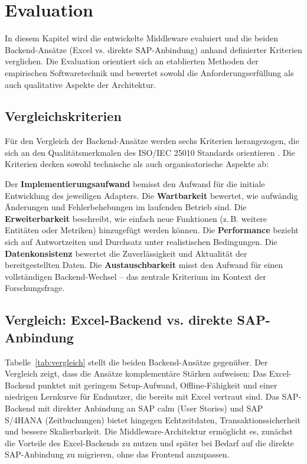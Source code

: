 \section{Evaluation}

In diesem Kapitel wird die entwickelte Middleware evaluiert und die beiden Backend-Ansätze (Excel vs. direkte SAP-Anbindung) anhand definierter Kriterien verglichen. Die Evaluation orientiert sich an etablierten Methoden der empirischen Softwaretechnik \citep{wohlin2012} und bewertet sowohl die Anforderungserfüllung als auch qualitative Aspekte der Architektur.

\subsection{Vergleichskriterien}

Für den Vergleich der Backend-Ansätze werden sechs Kriterien herangezogen, die sich an den Qualitätsmerkmalen des ISO/IEC 25010 Standards orientieren \citep{bass2021}. Die Kriterien decken sowohl technische als auch organisatorische Aspekte ab:

Der \textbf{Implementierungsaufwand} bemisst den Aufwand für die initiale Entwicklung des jeweiligen Adapters. Die \textbf{Wartbarkeit} bewertet, wie aufwändig Änderungen und Fehlerbehebungen im laufenden Betrieb sind. Die \textbf{Erweiterbarkeit} beschreibt, wie einfach neue Funktionen (z.\,B. weitere Entitäten oder Metriken) hinzugefügt werden können. Die \textbf{Performance} bezieht sich auf Antwortzeiten und Durchsatz unter realistischen Bedingungen. Die \textbf{Datenkonsistenz} bewertet die Zuverlässigkeit und Aktualität der bereitgestellten Daten. Die \textbf{Austauschbarkeit} misst den Aufwand für einen vollständigen Backend-Wechsel -- das zentrale Kriterium im Kontext der Forschungsfrage.

\subsection{Vergleich: Excel-Backend vs. direkte SAP-Anbindung}

Tabelle~\ref{tab:vergleich} stellt die beiden Backend-Ansätze gegenüber. Der Vergleich zeigt, dass die Ansätze komplementäre Stärken aufweisen: Das Excel-Backend punktet mit geringem Setup-Aufwand, Offline-Fähigkeit und einer niedrigen Lernkurve für Endnutzer, die bereits mit Excel vertraut sind. Das SAP-Backend mit direkter Anbindung an SAP \gls{calm} (User Stories) und SAP S/4HANA (Zeitbuchungen) bietet hingegen Echtzeitdaten, Transaktionssicherheit und bessere Skalierbarkeit. Die Middleware-Architektur ermöglicht es, zunächst die Vorteile des Excel-Backends zu nutzen und später bei Bedarf auf die direkte SAP-Anbindung zu migrieren, ohne das Frontend anzupassen.

